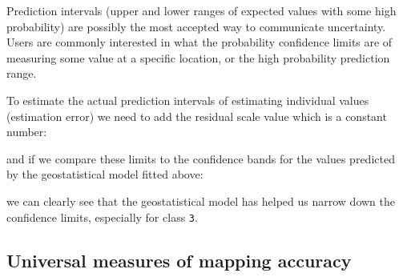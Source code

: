 \documentclass[graybox,natbib,nospthms,UStrade]{svmono}
\newenvironment{Shaded}{\begin{snugshade}}{\end{snugshade}}
\newcommand{\CommentTok}[1]{\textcolor[rgb]{0.37,0.37,0.37}{\textit{#1}}}
\newcommand{\DataTypeTok}[1]{\textcolor[rgb]{0.27,0.27,0.27}{#1}}
\newcommand{\DecValTok}[1]{\textcolor[rgb]{0.06,0.06,0.06}{#1}}
\newcommand{\KeywordTok}[1]{\textcolor[rgb]{0.27,0.27,0.27}{\textbf{#1}}}
\newcommand{\NormalTok}[1]{#1}
\newcommand{\OperatorTok}[1]{\textcolor[rgb]{0.43,0.43,0.43}{\textbf{#1}}}
\newcommand{\OtherTok}[1]{\textcolor[rgb]{0.37,0.37,0.37}{#1}}
\let\BeginKnitrBlock\begin \let\EndKnitrBlock\end
\let\BeginKnitrBlock\begin \let\EndKnitrBlock\end
\begin{document}
\BeginKnitrBlock{rmdnote}
Prediction intervals (upper and lower ranges of expected values with some
high probability) are possibly the most accepted way to communicate
uncertainty. Users are commonly interested in what the probability
confidence limits are of measuring some value at a specific location, or the
high probability prediction range.
\EndKnitrBlock{rmdnote}

To estimate the actual prediction intervals of estimating individual values
(estimation error) we need to add the residual scale value which is a
constant number:

\begin{Shaded}
\end{Shaded}

and if we compare these limits to the confidence bands for the values
predicted by the geostatistical model fitted above:

\begin{Shaded}
\end{Shaded}

we can clearly see that the geostatistical model has helped us narrow
down the confidence limits, especially for class \texttt{3}.

\hypertarget{universal-measures-of-mapping-accuracy}{%
\subsection{Universal measures of mapping accuracy}\label{universal-measures-of-mapping-accuracy}}
\end{document}
